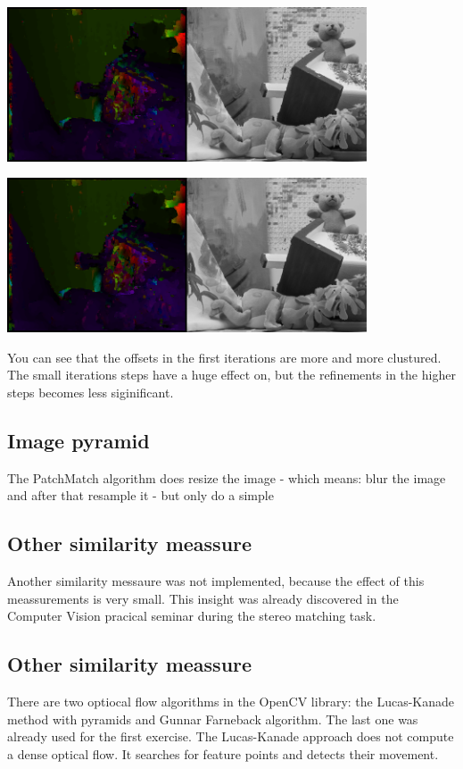 \documentclass[a4paper]{scrartcl}
\begin{document}
\vspace{1cm}
\begin{minipage}{0.8\textwidth}
  \centering
  \includegraphics[width=0.8\textwidth]{images/flow-py-1-it-2.png}
\end{minipage}

\vspace{1cm}
\begin{minipage}{0.8\textwidth}
  \centering
  \includegraphics[width=0.8\textwidth]{images/flow-py-1-it-3.png}
\end{minipage}

You can see that the offsets in the first iterations are more and more clustured.
The small iterations steps have a huge effect on, but the refinements in the higher
steps becomes less siginificant.


\subsection{Image pyramid}

The PatchMatch algorithm does resize the image - which means: blur the image and
after that resample it - but only do a simple 


\subsection{Other similarity meassure}

Another similarity messaure was not implemented, because the effect of this meassurements
is very small. This insight was already discovered in the Computer Vision pracical seminar
during the stereo matching task.


\subsection{Other similarity meassure}

There are two optiocal flow algorithms in the OpenCV library: the Lucas-Kanade method with pyramids and
Gunnar Farneback algorithm. The last one was already used for the first exercise. The Lucas-Kanade approach
does not compute a dense optical flow. It searches for feature points and detects their movement.
\end{document}

